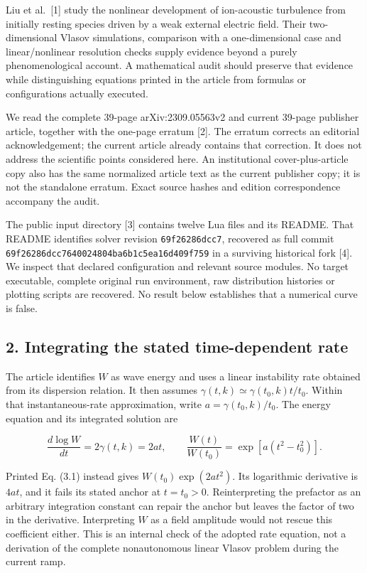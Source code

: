 Liu et al.~{[}1{]} study the nonlinear development of ion-acoustic
turbulence from initially resting species driven by a weak external
electric field. Their two-dimensional Vlasov simulations, comparison
with a one-dimensional case and linear/nonlinear resolution checks
supply evidence beyond a purely phenomenological account. A mathematical
audit should preserve that evidence while distinguishing equations
printed in the article from formulas or configurations actually
executed.

We read the complete 39-page arXiv:2309.05563v2 and current 39-page
publisher article, together with the one-page erratum {[}2{]}. The
erratum corrects an editorial acknowledgement; the current article
already contains that correction. It does not address the scientific
points considered here. An institutional cover-plus-article copy also
has the same normalized article text as the current publisher copy; it
is not the standalone erratum. Exact source hashes and edition
correspondence accompany the audit.

The public input directory {[}3{]} contains twelve Lua files and its
README. That README identifies solver revision \nolinkurl{69f26286dcc7},
recovered as full commit
\nolinkurl{69f26286dcc7640024804ba6b1c5ea16d409f759} in a surviving
historical fork {[}4{]}. We inspect that declared configuration and
relevant source modules. No target executable, complete original run
environment, raw distribution histories or plotting scripts are
recovered. No result below establishes that a numerical curve is false.

\subsection{2. Integrating the stated time-dependent
rate}\label{integrating-the-stated-time-dependent-rate}

The article identifies \(W\) as wave energy and uses a linear
instability rate obtained from its dispersion relation. It then assumes
\(\gamma(t,k)\simeq\gamma(t_0,k)t/t_0\). Within that instantaneous-rate
approximation, write \(a=\gamma(t_0,k)/t_0\). The energy equation and
its integrated solution are

\[
\frac{d\log W}{dt}=2\gamma(t,k)=2at,\qquad
\frac{W(t)}{W(t_0)}=\exp\!\left[a(t^2-t_0^2)\right].
\tag{1}
\]

Printed Eq. (3.1) instead gives \(W(t_0)\exp(2at^2)\). Its logarithmic
derivative is \(4at\), and it fails its stated anchor at \(t=t_0>0\).
Reinterpreting the prefactor as an arbitrary integration constant can
repair the anchor but leaves the factor of two in the derivative.
Interpreting \(W\) as a field amplitude would not rescue this
coefficient either. This is an internal check of the adopted rate
equation, not a derivation of the complete nonautonomous linear Vlasov
problem during the current ramp.

